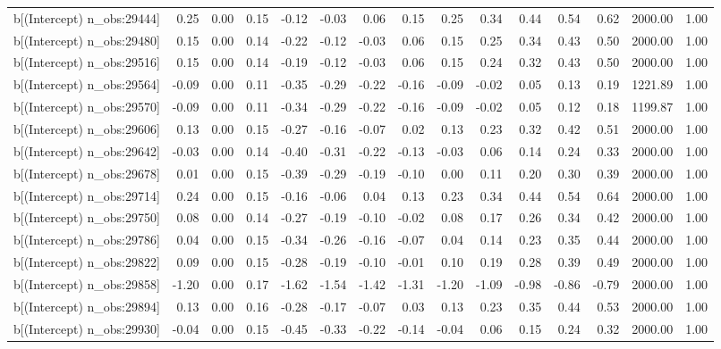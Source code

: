 \begin{table}[ht]
\begin{tabular}{rrrrrrrrrrrrrrr}
  b[(Intercept) n\_obs:29444] & 0.25 & 0.00 & 0.15 & -0.12 & -0.03 & 0.06 & 0.15 & 0.25 & 0.34 & 0.44 & 0.54 & 0.62 & 2000.00 & 1.00 \\ 
  b[(Intercept) n\_obs:29480] & 0.15 & 0.00 & 0.14 & -0.22 & -0.12 & -0.03 & 0.06 & 0.15 & 0.25 & 0.34 & 0.43 & 0.50 & 2000.00 & 1.00 \\ 
  b[(Intercept) n\_obs:29516] & 0.15 & 0.00 & 0.14 & -0.19 & -0.12 & -0.03 & 0.06 & 0.15 & 0.24 & 0.32 & 0.43 & 0.50 & 2000.00 & 1.00 \\ 
  b[(Intercept) n\_obs:29564] & -0.09 & 0.00 & 0.11 & -0.35 & -0.29 & -0.22 & -0.16 & -0.09 & -0.02 & 0.05 & 0.13 & 0.19 & 1221.89 & 1.00 \\ 
  b[(Intercept) n\_obs:29570] & -0.09 & 0.00 & 0.11 & -0.34 & -0.29 & -0.22 & -0.16 & -0.09 & -0.02 & 0.05 & 0.12 & 0.18 & 1199.87 & 1.00 \\ 
  b[(Intercept) n\_obs:29606] & 0.13 & 0.00 & 0.15 & -0.27 & -0.16 & -0.07 & 0.02 & 0.13 & 0.23 & 0.32 & 0.42 & 0.51 & 2000.00 & 1.00 \\ 
  b[(Intercept) n\_obs:29642] & -0.03 & 0.00 & 0.14 & -0.40 & -0.31 & -0.22 & -0.13 & -0.03 & 0.06 & 0.14 & 0.24 & 0.33 & 2000.00 & 1.00 \\ 
  b[(Intercept) n\_obs:29678] & 0.01 & 0.00 & 0.15 & -0.39 & -0.29 & -0.19 & -0.10 & 0.00 & 0.11 & 0.20 & 0.30 & 0.39 & 2000.00 & 1.00 \\ 
  b[(Intercept) n\_obs:29714] & 0.24 & 0.00 & 0.15 & -0.16 & -0.06 & 0.04 & 0.13 & 0.23 & 0.34 & 0.44 & 0.54 & 0.64 & 2000.00 & 1.00 \\ 
  b[(Intercept) n\_obs:29750] & 0.08 & 0.00 & 0.14 & -0.27 & -0.19 & -0.10 & -0.02 & 0.08 & 0.17 & 0.26 & 0.34 & 0.42 & 2000.00 & 1.00 \\ 
  b[(Intercept) n\_obs:29786] & 0.04 & 0.00 & 0.15 & -0.34 & -0.26 & -0.16 & -0.07 & 0.04 & 0.14 & 0.23 & 0.35 & 0.44 & 2000.00 & 1.00 \\ 
  b[(Intercept) n\_obs:29822] & 0.09 & 0.00 & 0.15 & -0.28 & -0.19 & -0.10 & -0.01 & 0.10 & 0.19 & 0.28 & 0.39 & 0.49 & 2000.00 & 1.00 \\ 
  b[(Intercept) n\_obs:29858] & -1.20 & 0.00 & 0.17 & -1.62 & -1.54 & -1.42 & -1.31 & -1.20 & -1.09 & -0.98 & -0.86 & -0.79 & 2000.00 & 1.00 \\ 
  b[(Intercept) n\_obs:29894] & 0.13 & 0.00 & 0.16 & -0.28 & -0.17 & -0.07 & 0.03 & 0.13 & 0.23 & 0.35 & 0.44 & 0.53 & 2000.00 & 1.00 \\ 
  b[(Intercept) n\_obs:29930] & -0.04 & 0.00 & 0.15 & -0.45 & -0.33 & -0.22 & -0.14 & -0.04 & 0.06 & 0.15 & 0.24 & 0.32 & 2000.00 & 1.00 \\ 

\end{tabular}
\end{table}
